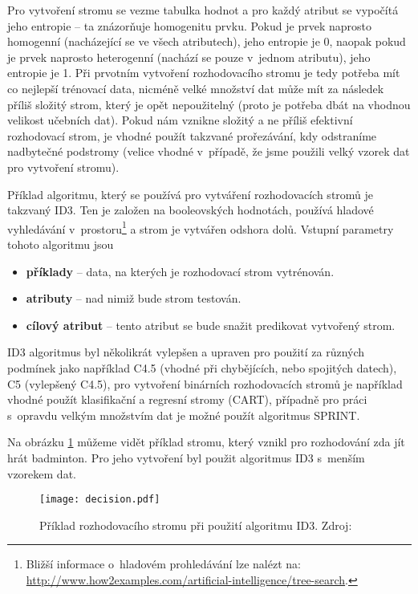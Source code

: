 \par Pro vytvoření stromu se vezme tabulka hodnot a pro každý atribut se vypočítá jeho entropie -- ta znázorňuje homogenitu prvku. Pokud je prvek naprosto homogenní (nacházející se ve všech atributech), jeho entropie je 0, naopak pokud je prvek naprosto heterogenní (nachází se pouze v~jednom atributu), jeho entropie je 1. Při prvotním vytvoření rozhodovacího stromu je tedy potřeba mít co nejlepší trénovací data, nicméně velké množství dat může mít za následek příliš složitý strom, který je opět nepoužitelný (proto je potřeba dbát na vhodnou velikost učebních dat). Pokud nám vznikne složitý a ne příliš efektivní rozhodovací strom, je vhodné použít takzvané prořezávání, kdy odstraníme nadbytečné podstromy (velice vhodné v~případě, že jsme použili velký vzorek dat pro vytvoření stromu). \cite{data-mining}

\par Příklad algoritmu, který se používá pro vytváření rozhodovacích stromů je takzvaný ID3. Ten je založen na booleovských hodnotách, používá hladové vyhledávání v~prostoru\footnote{Bližší informace o~hladovém prohledávání lze nalézt na: \url{http://www.how2examples.com/artificial-intelligence/tree-search}.} a strom je vytvářen odshora dolů. Vstupní parametry tohoto algoritmu jsou
\begin{itemize}
\item \textbf{příklady} -- data, na kterých je rozhodovací strom vytrénován.
\item \textbf{atributy} -- nad nimiž bude strom testován.
\item  \textbf{cílový atribut} -- tento atribut se bude snažit predikovat vytvořený strom. \cite{minigbook}
\end{itemize}
ID3 algoritmus byl několikrát vylepšen a upraven pro použití za různých podmínek jako například C4.5 (vhodné při chybějících, nebo spojitých datech), C5 (vylepšený C4.5), pro vytvoření binárních rozhodovacích stromů je například vhodné použít klasifikační a regresní stromy (CART), případně pro práci s~opravdu velkým množstvím dat je možné použít algoritmus SPRINT. \cite{minigbook}

\par Na obrázku \ref{decision-tree} můžeme vidět příklad stromu, který vznikl pro rozhodování zda jít hrát badminton. Pro jeho vytvoření byl použit algoritmus ID3 s~menším vzorekem dat.
\begin{figure}[htp]
\centering
\texttt{[image: decision.pdf]}
\caption[Příklad rozhodovacího stromu při použití algoritmu ID3]{Příklad rozhodovacího stromu při použití algoritmu ID3. Zdroj: \cite{minigbook}}
\label{decision-tree}
\end{figure}

